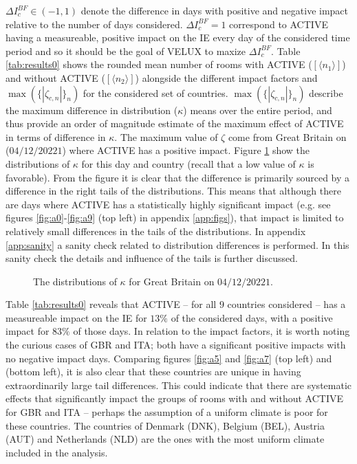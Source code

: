 \documentclass[fleqn,usenatbib,nofootinbib]{revtex4-2}
\begin{document}
	$\Delta I^{BF}_{c}\in (-1,1)$ denote the difference in days with positive and negative impact relative to the number of days considered. $\Delta I^{BF}_{c}=1$ correspond to ACTIVE having a measureable, positive impact on the IE every day of the considered time period and so it should be the goal of VELUX to maxize $\Delta I^{BF}_{c}$. Table \ref{tab:results0} shows the rounded mean number of rooms with ACTIVE ($[\langle n_1\rangle]$) and without ACTIVE ($[\langle n_2\rangle]$) alongside the different impact factors and $\max(\{|\zeta_{c,n}|\}_n)$ for the considered set of countries. $\max(\{|\zeta_{c,n}|\}_n)$ describe the maximum difference in distribution ($\kappa$) means over the entire period, and thus provide an order of magnitude estimate of the maximum effect of ACTIVE in terms of difference in $\kappa$. The maximum value of $\zeta$ come from Great Britain on ($04/12/20221$) where ACTIVE has a positive impact. Figure \ref{fig:g0} show the distributions of $\kappa$ for this day and country (recall that a low value of $\kappa$ is favorable). From the figure it is clear that the difference is primarily sourced by a difference in the right tails of the distributions. This means that although there are days where ACTIVE has a statistically highly significant impact (e.g. see figures \ref{fig:a0}-\ref{fig:a9} (top left) in appendix \ref{app:figs}), that impact is limited to relatively small differences in the tails of the distributions. In appendix \ref{app:sanity} a sanity check related to distribution differences is performed. In this sanity check the details and influence of the tails is further discussed. 
	\begin{figure}[h]
		\caption{\label{fig:g0} The distributions of $\kappa$ for Great Britain on $04/12/20221$.}
	\end{figure}	
	Table \ref{tab:results0} reveals that ACTIVE -- for all $9$ countries considered -- has a measureable impact on the IE for $13\%$ of the considered days, with a positive impact for $83\%$ of those days. In relation to the impact factors, it is worth noting the curious cases of GBR and ITA; both have a significant positive impacts with no negative impact days. Comparing figures \ref{fig:a5} and \ref{fig:a7} (top left) and (bottom left), it is also clear that these countries are unique in having extraordinarily large tail differences. This could indicate that there are systematic effects that significantly impact the groups of rooms with and without ACTIVE for GBR and ITA -- perhaps the assumption of a uniform climate is poor for these countries. The countries of Denmark (DNK), Belgium (BEL), Austria (AUT) and Netherlands (NLD) are the ones with the most uniform climate included in the analysis.
\end{document}
